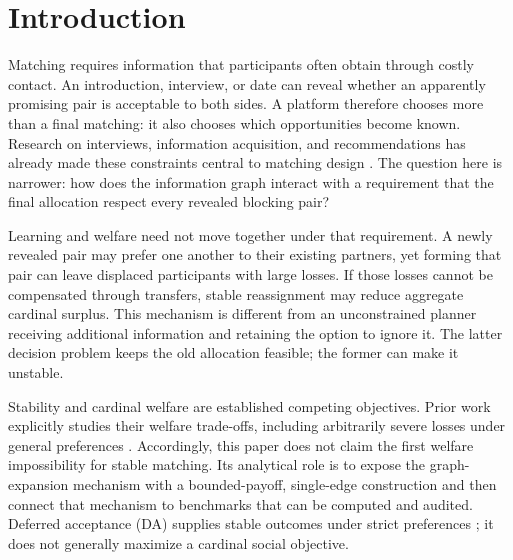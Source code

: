 \documentclass[11pt,a4paper]{article}
\begin{document}
\vspace{7pt}
\noindent{}

\section{Introduction}
Matching requires information that participants often obtain through costly contact. An introduction, interview, or date can reveal whether an apparently promising pair is acceptable to both sides. A platform therefore chooses more than a final matching: it also chooses which opportunities become known. Research on interviews, information acquisition, and recommendations has already made these constraints central to matching design \citep{E01,E02,E03,E04}. The question here is narrower: how does the information graph interact with a requirement that the final allocation respect every revealed blocking pair?

Learning and welfare need not move together under that requirement. A newly revealed pair may prefer one another to their existing partners, yet forming that pair can leave displaced participants with large losses. If those losses cannot be compensated through transfers, stable reassignment may reduce aggregate cardinal surplus. This mechanism is different from an unconstrained planner receiving additional information and retaining the option to ignore it. The latter decision problem keeps the old allocation feasible; the former can make it unstable.

Stability and cardinal welfare are established competing objectives. Prior work explicitly studies their welfare trade-offs, including arbitrarily severe losses under general preferences \citep{E10,E11}. Accordingly, this paper does not claim the first welfare impossibility for stable matching. Its analytical role is to expose the graph-expansion mechanism with a bounded-payoff, single-edge construction and then connect that mechanism to benchmarks that can be computed and audited. Deferred acceptance (DA) supplies stable outcomes under strict preferences \citep{E09}; it does not generally maximize a cardinal social objective.
\end{document}
